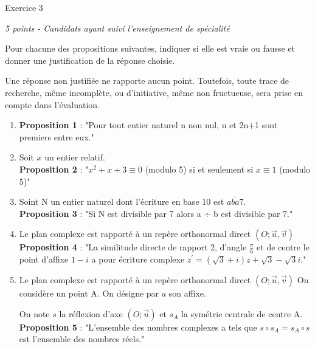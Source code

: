 
%
\begin{h2}Exercice 3\end{h2}
\textit{5 points - Candidats ayant suivi l'enseignement de spécialité}
\par
Pour chacune des propositions suivantes, indiquer si elle est vraie ou fausse et donner une justification de la réponse choisie.
\par
Une réponse non justifiée ne rapporte aucun point. Toutefois, toute trace de recherche, même incomplète, ou d'initiative, même non fructueuse, sera prise en compte dans l'évaluation.
\begin{enumerate}
     \item
     \textbf{Proposition 1} : "Pour tout entier naturel n non nul, n et 2n+1 sont premiers entre eux."
     \item
     Soit $x$ un entier relatif.
\\
     \textbf{Proposition 2} : "$x^{2}+x+3\equiv 0$ (modulo 5) si et seulement si $x \equiv 1$ (modulo 5)"
     \item
     Soint N un entier naturel dont l'écriture en base 10 est $\overline{aba7}$.
\\
     \textbf{Proposition 3} : "Si N est divisible par 7 alors a ÷ b est divisible par 7."
     \item
     Le plan complexe est rapporté à un repère orthonormal direct $\left(O; \vec{u} , \vec{v}\right)$
\\
     \textbf{Proposition 4} : "La similitude directe de rapport 2, d'angle $\frac{\pi }{6}$ et de centre le point d'affixe $1-i$ a pour écriture complexe $z^{\prime}=\left(\sqrt{3}+i\right)z+\sqrt{3}-\sqrt{3}i$."
     \item
     Le plan complexe est rapporté à un repère orthonormal direct $\left(O; \vec{u}, \vec{v}\right)$	On considère un point A. On désigne par $a$ son affixe.
     \par
     On note $s$ la réflexion d'axe  $\left(O; \vec{u}\right)$ et $s_{A}$ la symétrie centrale de centre A.
\\
     \textbf{Proposition 5} : "L'ensemble des nombres complexes a tels que $s \circ s_{A}=s_{A} \circ s$ est l'ensemble des nombres réels."
\end{enumerate}
